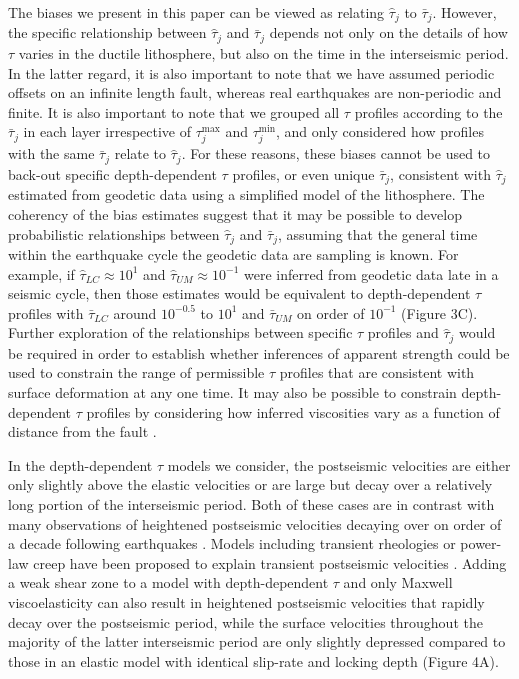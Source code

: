 The biases we present in this paper can be viewed as relating $\hat{\tau}_j$ to $\bar{\tau}_j$.  However, the specific relationship between $\hat{\tau}_j$ and $\bar{\tau}_j$ depends not only on the details of how $\tau$ varies in the ductile lithosphere, but also on the time in the interseismic period. In the latter regard, it is also important to note that we have assumed periodic offsets on an infinite length fault, whereas real earthquakes are non-periodic and finite.  It is also important to note that we grouped all $\tau$ profiles according to the $\bar{\tau}_j$ in each layer irrespective of $\tau^{\max}_j$ and $\tau^{\min}_j$, and only considered how profiles with the same $\bar{\tau}_j$ relate to $\hat{\tau}_j$.  For these reasons, these biases cannot be used to back-out specific depth-dependent $\tau$ profiles, or even unique $\bar{\tau}_j$, consistent with $\hat{\tau}_j$ estimated from geodetic data using a simplified model of the lithosphere.  The coherency of the bias estimates suggest that it may be possible to develop probabilistic relationships between $\hat{\tau}_j$ and $\bar{\tau}_j$, assuming that the general time within the earthquake cycle the geodetic data are sampling is known.  For example, if $\hat{\tau}_{LC} \approx 10^{1}$ and $\hat{\tau}_{UM} \approx 10^{-1}$ were inferred from geodetic data late in a seismic cycle, then those estimates would be equivalent to depth-dependent $\tau$ profiles with $\bar{\tau}_{LC}$ around $10^{-0.5}$ to $10^{1}$ and $\bar{\tau}_{UM}$ on order of $10^{-1}$ (Figure 3C). Further exploration of the relationships between specific $\tau$ profiles and $\hat{\tau}_j$ would be required in order to establish whether inferences of apparent strength could be used to constrain the range of permissible $\tau$ profiles that are consistent with surface deformation at any one time.  It may also be possible to constrain depth-dependent $\tau$ profiles by considering how inferred viscosities vary as a function of distance from the fault \citep{Yamasaki2012}.

In the depth-dependent $\tau$ models we consider, the postseismic velocities are either only slightly above the elastic velocities or are large but decay over a relatively long portion of the interseismic period. Both of these cases are in contrast with many observations of heightened postseismic velocities decaying over on order of a decade following earthquakes \citep[{\it e.g.},][]{Ergintav2009}. Models including transient rheologies or power-law creep have been proposed to explain transient postseismic velocities \citep[{\it e.g.},][]{Pollitz2003,Freed2006b,Ryder2007}.  Adding a weak shear zone to a model with depth-dependent $\tau$ and only Maxwell viscoelasticity can also result in heightened postseismic velocities that rapidly decay over the postseismic period, while the surface velocities throughout the majority of the latter interseismic period are only slightly depressed compared to those in an elastic model with identical slip-rate and locking depth (Figure 4A).

